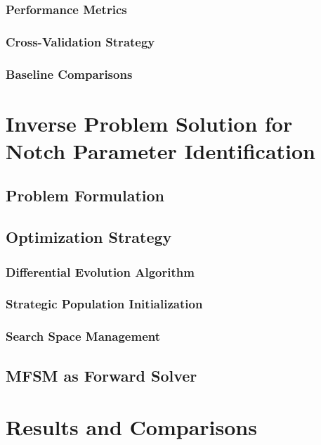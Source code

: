 \documentclass[12pt,a4paper]{report}
\begin{document}
\subsection{Performance Metrics}


\subsection{Cross-Validation Strategy}


\subsection{Baseline Comparisons}


\chapter{Inverse Problem Solution for Notch Parameter Identification}
\label{chap:inverse_new}

\section{Problem Formulation}
\label{sec:inverse_formulation_new}

\section{Optimization Strategy}

\subsection{Differential Evolution Algorithm}

\subsection{Strategic Population Initialization}

\subsection{Search Space Management}

\section{MFSM as Forward Solver}


\chapter{Results and Comparisons}
\label{chap:results}
\end{document}

